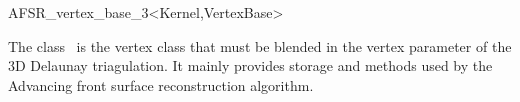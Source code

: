 \begin{ccRefClass}{AFSR_vertex_base_3<Kernel,VertexBase>}

\ccDefinition
  
The class \ccRefName\ is the vertex class that must be blended in the vertex parameter
of the 3D Delaunay triagulation. It mainly provides storage and methods used by the
Advancing front surface reconstruction algorithm.



\ccInheritsFrom










\end{ccRefClass}
